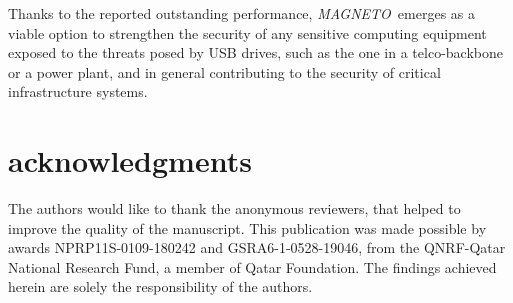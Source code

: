 \documentclass[acmsmall, authorversion]{acmart}
\newcommand{\sol}{\emph{MAGNETO}}
\begin{document}
Thanks to the reported outstanding performance, \sol\ emerges as a viable option to strengthen the security of any sensitive computing equipment exposed to the threats posed by USB drives, such as the one in a telco-backbone or a power plant, and in general contributing to the security of critical infrastructure systems.

\section*{acknowledgments}
The authors would like to thank the anonymous reviewers, that helped to improve the quality of the manuscript.
This publication was made possible by awards NPRP11S-0109-180242 and GSRA6-1-0528-19046, from the QNRF-Qatar National Research Fund, a member of Qatar Foundation. The findings achieved herein are solely the responsibility of the authors.



\end{document}
